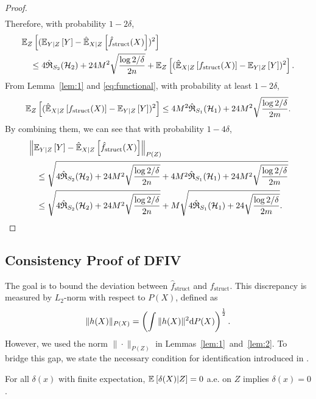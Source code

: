 \begin{proof}
\begin{align*}
\end{align*}
Therefore, with probability $1-2\delta$,
\begin{align*}
    &\expect[Z]{(\expect[Y|Z]{Y} - \hatexpect[X|Z]{\hat{f}_{\mathrm{struct}}(X)})^2} \\
    &\quad \leq 4\hat{\mathfrak{R}}_{S_2}(\mathcal{H}_2) + 24M^2\sqrt{\frac{\log 2/\delta}{2n}}+ \expect[Z]{(\hatexpect[X|Z]{{f}_{\mathrm{struct}}(X)} - \expect[Y|Z]{Y})^2}.
\end{align*}
From Lemma~\ref{lem:1} and \eqref{eq:functional}, with probability at least $1-2\delta$,
\begin{align*}
    \expect[Z]{(\hatexpect[X|Z]{{f}_{\mathrm{struct}}(X)} - \expect[Y|Z]{Y})^2} \leq 4M^2\hat{\mathfrak{R}}_{S_1}(\mathcal{H}_1) + 24M^2 \sqrt{\frac{\log 2/\delta}{2m}}.
\end{align*}
By combining them, we can see that with probability $1-4\delta$,
\begin{align*}
    &\left\|\expect[Y|Z]{Y} - \hatexpect[X|Z]{\hat{f}_{\mathrm{struct}}(X)}\right\|_{P(Z)} \\
    &\quad \leq \sqrt{4\hat{\mathfrak{R}}_{S_2}(\mathcal{H}_2) + 24M^2\sqrt{\frac{\log 2/\delta}{2n}} + 4M^2\hat{\mathfrak{R}}_{S_1}(\mathcal{H}_1) + 24M^2 \sqrt{\frac{\log 2/\delta}{2m}}}\\
    &\quad \leq \sqrt{4\hat{\mathfrak{R}}_{S_2}(\mathcal{H}_2) + 24M^2\sqrt{\frac{\log 2/\delta}{2n}}} + M\sqrt{4\hat{\mathfrak{R}}_{S_1}(\mathcal{H}_1) + 24 \sqrt{\frac{\log 2/\delta}{2m}}}.
\end{align*}
\end{proof}

 \subsection{Consistency Proof of DFIV}
 The goal is to bound the deviation between $\hat{f}_{\mathrm{struct}}$ and $f_{\mathrm{struct}}$. This discrepancy is measured by $L_2$-norm with respect to $P(X)$, defined as
 \begin{align*}
     \|h(X)\|_{P(X)} =  \left(\int \|h(X)\|^2 \intd P(X)\right)^{\frac12}.
 \end{align*}
 However, we used the norm $\|\cdot\|_{P(Z)}$ in Lemmas~\ref{lem:1}~and~\ref{lem:2}. To bridge this gap, we state  the necessary condition for identification introduced in \citep{Newey2003}.

 \begin{prop}{\citep[Proposition~2.1][]{Newey2003}}\label{prop:identification}
   For all $\delta(x)$ with finite expectation, $\expect{\delta(X)|Z} = 0$ a.e. on $Z$  %
   implies $\delta(x) = 0$.
 \end{prop}
 
